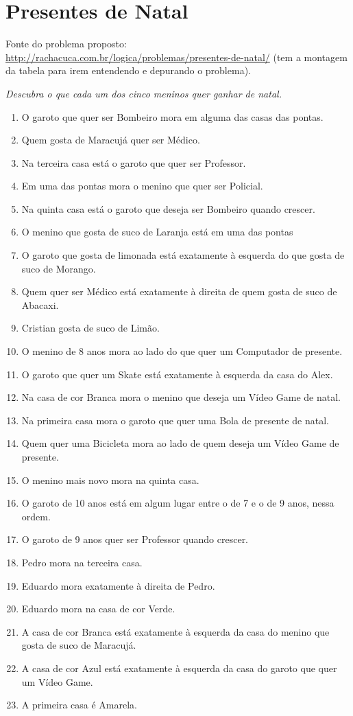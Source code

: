 \documentclass[a4paper,12pt]{article}
\begin{document}
\newpage
\section{Presentes de Natal}

 Fonte do problema proposto:\\
 \url{http://rachacuca.com.br/logica/problemas/presentes-de-natal/}
 (tem a montagem da tabela para irem entendendo e depurando o problema).\\

{\em 
Descubra o que cada um dos cinco meninos quer ganhar de natal.
\begin{enumerate}
\item	O garoto que quer ser Bombeiro mora em alguma das casas das pontas.
\item	Quem gosta de Maracujá quer ser Médico.
\item	Na terceira casa está o garoto que quer ser Professor.
\item	Em uma das pontas mora o menino que quer ser Policial.
\item	Na quinta casa está o garoto que deseja ser Bombeiro quando crescer.
\item	O menino que gosta de suco de Laranja está em uma das pontas
\item	O garoto que gosta de limonada está exatamente à esquerda do que gosta de suco de Morango.
\item	Quem quer ser Médico está exatamente à direita de quem gosta de suco de Abacaxi.
\item	Cristian gosta de suco de Limão.
\item	O menino de 8 anos mora ao lado do que quer um Computador de presente.
\item	O garoto que quer um Skate está exatamente à esquerda da casa do Alex.
\item	Na casa de cor Branca mora o menino que deseja um Vídeo Game de natal.
\item	Na primeira casa mora o garoto que quer uma Bola de presente de natal.
\item	Quem quer uma Bicicleta mora ao lado de quem deseja um Vídeo Game de presente.
\item	O menino mais novo mora na quinta casa.
\item	O garoto de 10 anos está em algum lugar entre o de 7 e o de 9 anos, nessa ordem.
\item	O garoto de 9 anos quer ser Professor quando crescer.
\item	Pedro mora na terceira casa.
\item	Eduardo mora exatamente à direita de Pedro.
\item	Eduardo mora na casa de cor Verde.
\item	A casa de cor Branca está exatamente à esquerda da casa do menino que gosta de suco de Maracujá.
\item	A casa de cor Azul está exatamente à esquerda da casa do garoto que quer um Vídeo Game.
\item	A primeira casa é Amarela.
   

\end{enumerate}}
\end{document}
